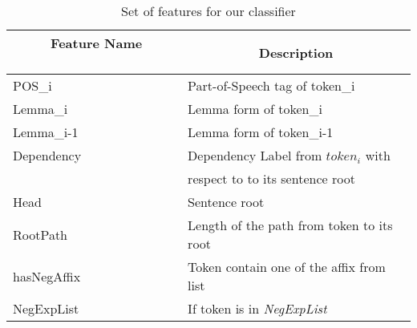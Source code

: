 
\begin{table}
\centering
\begin{tabular}{ll}
\multicolumn{1}{c}{\textbf{~ ~ ~ Feature Name~ ~ ~ ~}} & \multicolumn{1}{c}{\textbf{Description}}                                                                                              \\ 
\hline\hline
POS_i                                                 & Part-of-Speech tag of token_i\\
Lemma_i                                               & Lemma form of token_i\\
Lemma_{i-1}                                           & Lemma form of token_{i-1}\\
Dependency                                            & Dependency Label from $token_{i}$ with\\& respect to to its sentence root \\
Head                                                  & Sentence root\\
RootPath                                              & Length of the path from token to its root\\
hasNegAffix                                           & Token contain one of the affix from list \\
NegExpList                                            & If token is in \textit{NegExpList}\\
\hline
\end{tabular}
\caption{\label{tab:features} Set of features for our classifier}
\end{table}